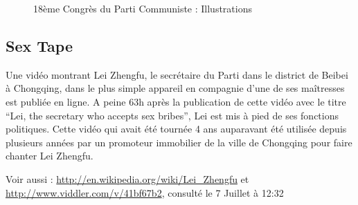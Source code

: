 \begin{figure}[h!]
    \caption{
      18ème Congrès du Parti Communiste : Illustrations
    }
\end{figure}


\clearpage
\subsection*{Sex Tape}
\label{sec:sextape}

Une vidéo montrant Lei Zhengfu, le secrétaire du Parti dans le district de Beibei à Chongqing, dans le plus simple appareil en compagnie d'une de ses maîtresses est publiée en ligne. A peine 63h après la publication de cette vidéo avec le titre ``Lei, the secretary who accepts sex bribes'', Lei est mis à pied de ses fonctions politiques. Cette vidéo qui avait été tournée 4 ans auparavant été utilisée depuis plusieurs années par un promoteur immobilier de la ville de Chongqing pour faire chanter Lei Zhengfu. 

Voir aussi :
\url{http://en.wikipedia.org/wiki/Lei_Zhengfu}
et 
\url{http://www.viddler.com/v/41bf67b2}, consulté le 7 Juillet à 12:32

